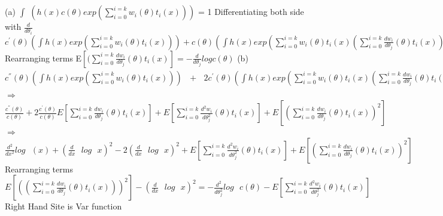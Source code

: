 \documentclass{report}
\begin{document}
\section{}
(a) $\int$ $\left(h(x)c(\theta)exp(\sum_{i=0}^{i=k}w_{i}(\theta)t_i(x))\right)$ = 1
\newline
Differentiating both side with $\frac{d}{d\theta_{i}}$
\newline
$c^{'}(\theta)\left( \int h(x)exp(\sum_{i=0}^{i=k}w_{i}(\theta)t_i(x))\right) + c(\theta)\left(\int h(x)exp(\sum_{i=0}^{i=k}w_{i}(\theta)t_i(x)(\sum_{i=0}^{i=k}\frac{dw_{i}}{d\theta_{j}}(\theta)t_i(x)))\right)$
\newline
Rearranging terms
\newline
E$\left[(\sum_{i=0}^{i=k}\frac{dw_{i}}{d\theta_{j}}(\theta)t_i(x)\right] = -\frac{d}{d\theta_{j}}log c(\theta)$
\newline
(b) $c^{''}(\theta)\left( \int h(x)exp(\sum_{i=0}^{i=k}w_{i}(\theta)t_i(x))\right)\text{ }+\text{ } 2c^{'}(\theta)\left(\int h(x)exp(\sum_{i=0}^{i=k}w_{i}(\theta)t_i(x)(\sum_{i=0}^{i=k}\frac{dw_{i}}{d\theta_{j}}(\theta)t_i(x)))\right) + c(\theta)\left(\int h(x)exp(\sum_{i=0}^{i=k}w_{i}(\theta)t_i(x)(\sum_{i=0}^{i=k}\frac{d^{2}w_{i}}{d\theta_{j}^{2}}(\theta)t_i(x))) + \int h(x)exp(\sum_{i=0}^{i=k}w_{i}(\theta)t_i(x)(\sum_{i=0}^{i=k}\frac{dw_{i}}{d\theta_{j}}(\theta)t_i(x))^{2})\right)$
\newline
$\Rightarrow$ $\frac{c^{''}(\theta)}{c(\theta)} + 2\frac{c^{'}(\theta)}{c(\theta)}E\left[\sum_{i=0}^{i=k}\frac{dw_{i}}{d\theta_{j}}(\theta)t_i(x)\right] + E\left[\sum_{i=0}^{i=k}\frac{d^{2}w_{i}}{d\theta_{j}^{2}}(\theta)t_i(x)\right] + E\left[(\sum_{i=0}^{i=k}\frac{dw_{i}}{d\theta_{j}}(\theta)t_i(x))^{2}\right]$
\newline
$\Rightarrow$ $\frac{d^2}{dx^2}log\text{ }(x) + \left(\frac{d}{dx}\text{ }log\text{ }x\right)^2 - 2\left(\frac{d}{dx}\text{ }log\text{ }x\right)^2 + E\left[\sum_{i=0}^{i=k}\frac{d^{2}w_{i}}{d\theta_{j}^{2}}(\theta)t_i(x)\right] + E\left[(\sum_{i=0}^{i=k}\frac{dw_{i}}{d\theta_{j}}(\theta)t_i(x))^{2}\right]$
\newline
\newline
Rearranging terms
$E\left[((\sum_{i=0}^{i=k}\frac{dw_{i}}{d\theta_{j}}(\theta)t_i(x)))^{2}\right] - \left(\frac{d}{dx}\text{ }log\text{ }x\right)^2 = -\frac{d^2}{d\theta_{j}^2}log\text{ }c(\theta) - E\left[\sum_{i=0}^{i=k}\frac{d^{2}w_{i}}{d\theta_{j}^{2}}(\theta)t_i(x)\right]$
\newline
Right Hand Site is Var function
\newline
\end{document}
